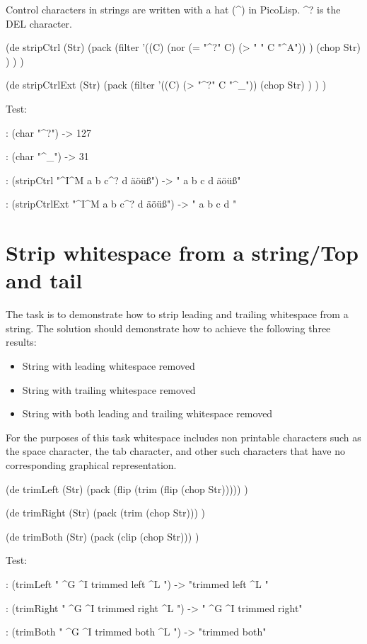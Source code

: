 \begin{wideverbatim}

Control characters in strings are written with a hat (^) in PicoLisp.
^? is the DEL character.

(de stripCtrl (Str)
   (pack
      (filter
         '((C)
            (nor (= "^?" C) (> " " C "^A")) )
         (chop Str) ) ) )

(de stripCtrlExt (Str)
   (pack
      (filter
         '((C) (> "^?" C "^_"))
         (chop Str) ) ) )

Test:

: (char "^?")
-> 127

: (char "^_")
-> 31

: (stripCtrl "^I^M a b c^? d äöüß")
-> " a b c d äöüß"

: (stripCtrlExt "^I^M a b c^? d äöüß")
-> " a b c d "

\end{wideverbatim}

\pagebreak{}
\section*{Strip whitespace from a string/Top and tail}

The task is to demonstrate how to strip leading and trailing whitespace
from a string. The solution should demonstrate how to achieve the
following three results:

\begin{itemize}
\item
  String with leading whitespace removed
\item
  String with trailing whitespace removed
\item
  String with both leading and trailing whitespace removed
\end{itemize}

For the purposes of this task whitespace includes non printable
characters such as the space character, the tab character, and other
such characters that have no corresponding graphical representation.


\begin{wideverbatim}

(de trimLeft (Str)
   (pack (flip (trim (flip (chop Str))))) )

(de trimRight (Str)
   (pack (trim (chop Str))) )

(de trimBoth (Str)
   (pack (clip (chop Str))) )

Test:

: (trimLeft " ^G ^I trimmed left ^L ")
-> "trimmed left ^L "

: (trimRight " ^G ^I trimmed right ^L ")
-> " ^G ^I trimmed right"

: (trimBoth " ^G ^I trimmed both ^L ")
-> "trimmed both"

\end{wideverbatim}

